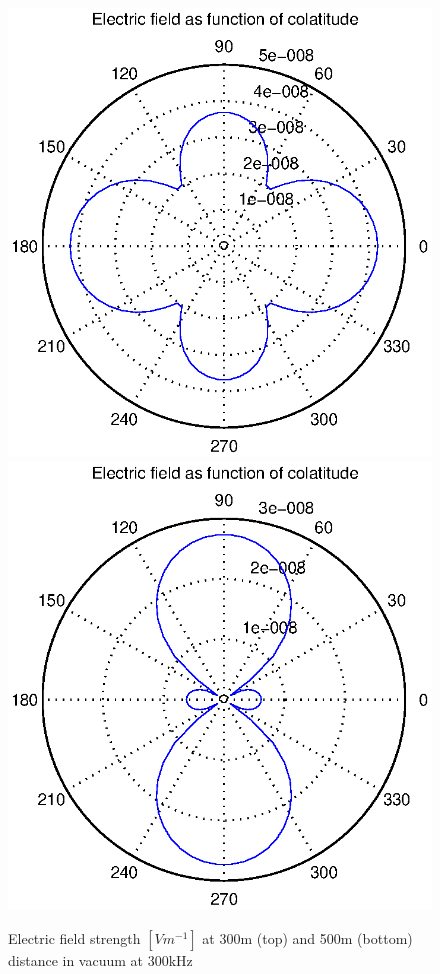 \documentclass[a4paper,11pt]{thesis}
\begin{document}
\begin{figure}
\begin{center}
  \includegraphics[width=11.5cm]{DissPics/NFvac300m300kHz.eps}
 \includegraphics[width=11.5cm]{DissPics/NFvac500m300kHz.eps}
  \caption{Electric field strength $[Vm^{-1}]$ at 300m (top) and 500m (bottom) distance in vacuum at 300kHz}\label{figNFvac300m300kHz}
  \end{center}
\end{figure}
\end{document}
